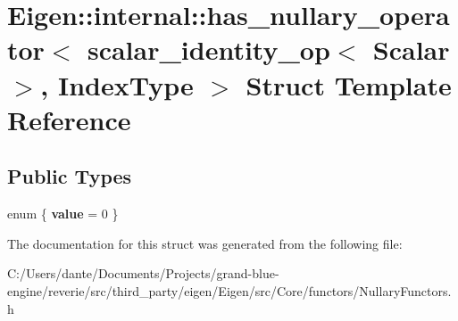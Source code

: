 \hypertarget{struct_eigen_1_1internal_1_1has__nullary__operator_3_01scalar__identity__op_3_01_scalar_01_4_00_01_index_type_01_4}{}\section{Eigen\+::internal\+::has\+\_\+nullary\+\_\+operator$<$ scalar\+\_\+identity\+\_\+op$<$ Scalar $>$, Index\+Type $>$ Struct Template Reference}
\label{struct_eigen_1_1internal_1_1has__nullary__operator_3_01scalar__identity__op_3_01_scalar_01_4_00_01_index_type_01_4}
\subsection*{Public Types}
\begin{DoxyCompactItemize}
\item 
\mbox{\label{struct_eigen_1_1internal_1_1has__nullary__operator_3_01scalar__identity__op_3_01_scalar_01_4_00_01_index_type_01_4_afe74255543ac48b767d74745c7cc1a40}} 
enum \{ {\bfseries value} = 0
 \}
\end{DoxyCompactItemize}


The documentation for this struct was generated from the following file\+:\begin{DoxyCompactItemize}
\item 
C\+:/\+Users/dante/\+Documents/\+Projects/grand-\/blue-\/engine/reverie/src/third\+\_\+party/eigen/\+Eigen/src/\+Core/functors/Nullary\+Functors.\+h\end{DoxyCompactItemize}
